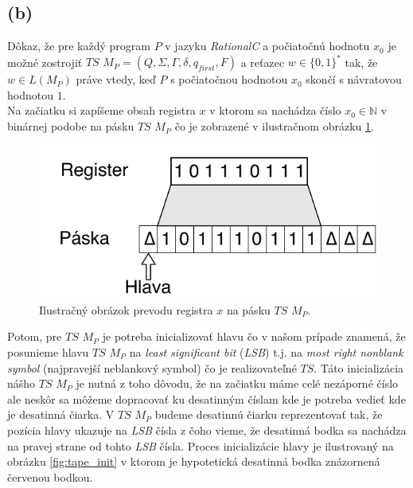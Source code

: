 \documentclass[11pt,a4paper]{article}
\begin{document}
\newpage
\subsection{(b)}
Dôkaz, že pre každý program $P$ v jazyku \textit{RationalC} a počiatočnú hodnotu $x_0$ je možné zostrojiť $TS$ $M_P = (Q, \Sigma, \Gamma, \delta, q_{first}, F)$ a reťazec $w \in \{0,1\}^*$ tak, že $w \in L(M_P)$ práve vtedy, keď $P$ s počiatočnou hodnotou $x_0$ skončí s návratovou hodnotou $1$.\\

Na začiatku si zapíšeme obsah registra $x$ v ktorom sa nachádza číslo $x_0 \in \mathbb{N}$ v binárnej podobe na pásku $TS$ $M_P$ čo je zobrazené v ilustračnom obrázku \ref{fig:reg_to_tape}.

\begin{figure}[!h]
    \centering
    \includegraphics[scale=1]{img/register_to_tape.pdf}
    \caption{Ilustračný obrázok prevodu registra $x$ na pásku $TS$ $M_P$.}
    \label{fig:reg_to_tape}
\end{figure}

Potom, pre $TS$ $M_P$ je potreba inicializovať hlavu čo v našom prípade znamená, že posunieme hlavu $TS$ $M_P$ na \textit{least significant bit} (\textit{LSB}) t.j. na \textit{most right nonblank symbol} (najpravejší neblankový symbol) čo je realizovateľné $TS$. Táto inicializácia nášho $TS$ $M_P$ je nutná z toho dôvodu, že na začiatku máme celé nezáporné číslo ale neskôr sa môžeme dopracovať ku desatinným číslam kde je potreba vedieť kde je desatinná čiarka. V $TS$ $M_P$ budeme desatinnú čiarku reprezentovať tak, že pozícia hlavy ukazuje na \textit{LSB} čísla z čoho vieme, že desatinná bodka sa nachádza na pravej strane od tohto \textit{LSB} čísla. Proces inicializácie hlavy je ilustrovaný na obrázku \ref{fig:tape_init} v ktorom je hypotetická desatinná bodka znázornená červenou bodkou.\\
\end{document}
